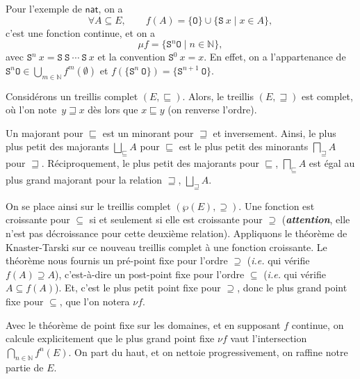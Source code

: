 \documentclass[../main]{subfiles}
\begin{document}
  \begin{exm}
    Pour l'exemple de $\mathsf{nat}$, on a \[
    \forall A \subseteq E, \quad\quad f(A) = \{\mathtt{O}\} \cup \{\mathtt{S}\ x  \mid x \in A\}
    ,\]
    c'est une fonction continue, et on a \[
    \mu f = \{\mathtt{S}^n \mathtt{O}  \mid  n\in \mathds{N}\}
    ,\] avec $\mathtt{S}^n\ x = \mathtt{S}\ \mathtt{S}\ \cdots \ \mathtt{S}\ x$ et la convention $\mathtt{S}^0\ x = x$.
    En effet, on a  l'appartenance de $\mathtt{S}^n \mathtt{O} \in \bigcup_{m \in \mathds{N}} f^m(\emptyset)$ et $f(\{\mathtt{S}^n\ \mathtt{O}\}) = \{\mathtt{S}^{n+1}\ \mathtt{O}\}$.
  \end{exm}

  \begin{rmk}
    Considérons un treillis complet $(E, \sqsubseteq)$.
    Alors, le treillis $(E, \sqsupseteq)$ est complet, où l'on note~$y \sqsupseteq x$ dès lors que $x \sqsubseteq y$ (on renverse l'ordre).

    Un majorant pour $\sqsubseteq$ est un minorant pour $\sqsupseteq$ et inversement.
    Ainsi, le plus plus petit des majorants $\bigsqcup_\sqsubseteq A$ pour $\sqsubseteq$ est le plus petit des minorants $\bigsqcap_\sqsupseteq A$ pour $\sqsupseteq$.
    Réciproquement, le plus petit des majorants pour $\sqsubseteq$, $\bigsqcap_{\sqsubseteq} A$ est égal au plus grand majorant pour la relation $\sqsupseteq$, $\bigsqcup_{\sqsupseteq} A$.
  \end{rmk}

  On se place ainsi sur le treillis complet $(\wp(E), \supseteq)$.
  Une fonction est croissante pour $\subseteq$ si et seulement si elle est croissante pour $\supseteq$ (\textit{\textbf{attention}}, elle n'est pas décroissance pour cette deuxième relation).
  Appliquons le théorème de Knaster-Tarski sur ce nouveau treillis complet à une fonction croissante.
  Le théorème nous fournis un pré-point fixe pour l'ordre $\supseteq$ (\textit{i.e.} qui vérifie $f(A) \supseteq A$), c'est-à-dire un post-point fixe pour l'ordre $\subseteq$ (\textit{i.e.} qui vérifie $A \subseteq f(A)$).
  Et, c'est le plus petit point fixe pour $\supseteq$, donc le plus grand point fixe pour $\subseteq$, que l'on notera $\nu f$.

  Avec le théorème de point fixe sur les domaines, et en supposant $f$ continue, on calcule explicitement que le plus grand point fixe $\nu f$ vaut l'intersection $\bigcap_{n \in \mathds{N}} f^n(E)$.
  On part du haut, et on nettoie progressivement, on raffine notre partie de $E$.
\end{document}
